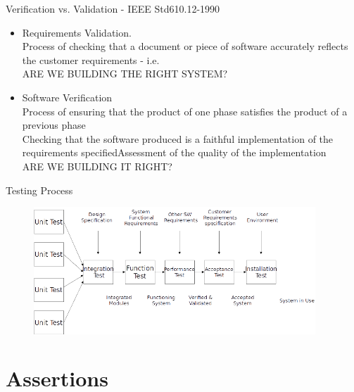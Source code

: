 \documentclass[11pt, xcolor=svgnames]{beamer}
\begin{document}

\begin{frame}[fragile]{Verification vs. Validation - IEEE Std610.12-1990}

\begin{itemize}
 \item Requirements Validation.\\
 Process of checking that a document or piece of software accurately reflects the customer requirements - i.e. \\
 ARE WE BUILDING THE RIGHT SYSTEM?

\item Software Verification \\ Process of ensuring that the product of one phase satisfies the product of a previous phase \\
Checking that the software produced is a faithful implementation of the requirements specifiedAssessment of the quality of the implementation \\
ARE WE BUILDING IT RIGHT?
\end{itemize}

\end{frame}




\begin{frame}{Testing Process}

\begin{figure}
 \includegraphics[width=300pt]{./figs/testing}
\end{figure} 

\end{frame}




\section{Assertions}
\end{document}
